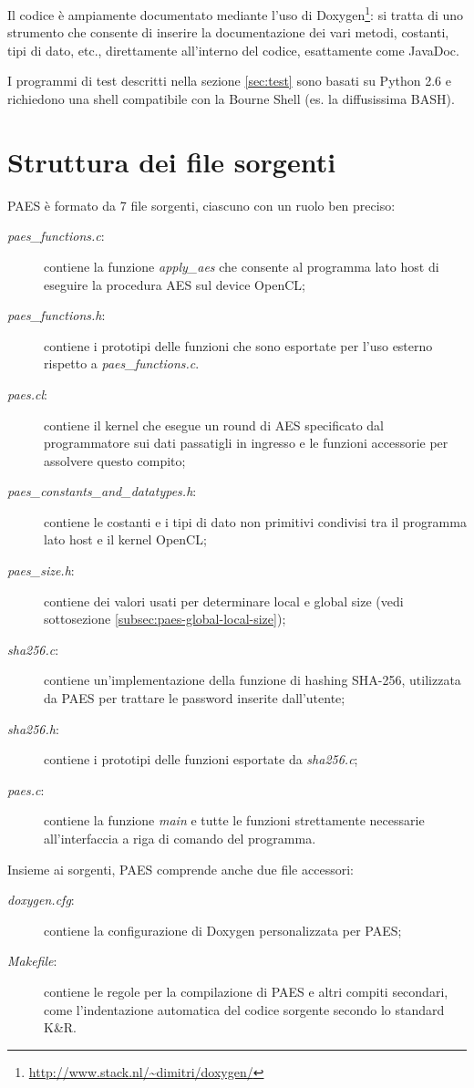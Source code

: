 \documentclass[12pt,a4paper,oneside]{book}
\begin{document}
Il codice è ampiamente documentato mediante l'uso di Doxygen\footnote{\url{http://www.stack.nl/~dimitri/doxygen/}}: si tratta di uno strumento che consente di inserire la documentazione dei vari metodi, costanti, tipi di dato, etc., direttamente all'interno del codice, esattamente come JavaDoc.

I programmi di test descritti nella sezione \ref{sec:test} sono basati su Python 2.6 e richiedono una shell compatibile con la Bourne Shell (es. la diffusissima BASH).

\section{Struttura dei file sorgenti}
\label{sec:paes-files}

PAES è formato da 7 file sorgenti, ciascuno con un ruolo ben preciso:
\begin{description}
\item[\textit{paes\_functions.c}:] contiene la funzione \textit{apply\_aes} che consente al programma lato host di eseguire la procedura \ac{AES} sul device \ac{OpenCL};
\item[\textit{paes\_functions.h}:] contiene i prototipi delle funzioni che sono esportate per l'uso esterno rispetto a \textit{paes\_functions.c}.
\item[\textit{paes.cl}:] contiene il kernel che esegue un round di \ac{AES} specificato dal programmatore sui dati passatigli in ingresso e le funzioni accessorie per assolvere questo compito;
\item[\textit{paes\_constants\_and\_datatypes.h}:] contiene le costanti e i tipi di dato non primitivi condivisi tra il programma lato host e il kernel \ac{OpenCL};
\item[\textit{paes\_size.h}:] contiene dei valori usati per determinare local e global size (vedi sottosezione \ref{subsec:paes-global-local-size});
\item[\textit{sha256.c}:] contiene un'implementazione della funzione di hashing SHA-256, utilizzata da PAES per trattare le password inserite dall'utente;
\item[\textit{sha256.h}:] contiene i prototipi delle funzioni esportate da \textit{sha256.c};
\item[\textit{paes.c}:] contiene la funzione \textit{main} e tutte le funzioni strettamente necessarie all'interfaccia a riga di comando del programma.
\end{description}

Insieme ai sorgenti, PAES comprende anche due file accessori:
\begin{description}
\item[\textit{doxygen.cfg}:] contiene la configurazione di Doxygen personalizzata per PAES;
\item[\textit{Makefile}:] contiene le regole per la compilazione di PAES e altri compiti secondari, come l'indentazione automatica del codice sorgente secondo lo standard K\&R.
\end{description}
\end{document}
